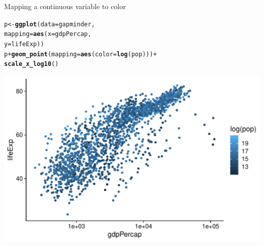 \documentclass[10pt,handout]{beamer}\usepackage[]{graphicx}\usepackage[]{color}
\makeatletter
\def\maxwidth{ %
  \ifdim\Gin@nat@width>\linewidth
    \linewidth
  \else
    \Gin@nat@width
  \fi
}
\newcommand{\hlopt}[1]{\textcolor[rgb]{0,0,0}{#1}}%
\newcommand{\hlstd}[1]{\textcolor[rgb]{0.345,0.345,0.345}{#1}}%
\newcommand{\hlkwb}[1]{\textcolor[rgb]{0.69,0.353,0.396}{#1}}%
\newcommand{\hlkwc}[1]{\textcolor[rgb]{0.333,0.667,0.333}{#1}}%
\newcommand{\hlkwd}[1]{\textcolor[rgb]{0.737,0.353,0.396}{\textbf{#1}}}%
\newenvironment{kframe}{%
 \def\at@end@of@kframe{}%
 \ifinner\ifhmode%
  \def\at@end@of@kframe{\end{minipage}}%
  \begin{minipage}{\columnwidth}%
 \fi\fi%
 \def\FrameCommand##1{\hskip\@totalleftmargin \hskip-\fboxsep
 \colorbox{shadecolor}{##1}\hskip-\fboxsep
     \hskip-\linewidth \hskip-\@totalleftmargin \hskip\columnwidth}%
 \MakeFramed {\advance\hsize-\width
   \@totalleftmargin\z@ \linewidth\hsize
   \@setminipage}}%
 {\par\unskip\endMakeFramed%
 \at@end@of@kframe}
\newenvironment{knitrout}{}{} %
\makeatother
\begin{document}
\begin{frame}[fragile]{Mapping a continuous variable to color}
\begin{knitrout}\tiny
{}\color{fgcolor}\begin{kframe}
\begin{alltt}
\hlstd{p} \hlkwb{<-} \hlkwd{ggplot}\hlstd{(}\hlkwc{data} \hlstd{= gapminder,}
            \hlkwc{mapping} \hlstd{=} \hlkwd{aes}\hlstd{(}\hlkwc{x} \hlstd{= gdpPercap,}
                          \hlkwc{y} \hlstd{= lifeExp))}
\hlstd{p} \hlopt{+} \hlkwd{geom_point}\hlstd{(}\hlkwc{mapping} \hlstd{=} \hlkwd{aes}\hlstd{(}\hlkwc{color} \hlstd{=} \hlkwd{log}\hlstd{(pop)))} \hlopt{+}
                 \hlkwd{scale_x_log10}\hlstd{()}
\end{alltt}
\end{kframe}

{\centering \includegraphics[width=\maxwidth]{figure/unnamed-chunk-19-1} 

}


\end{knitrout}

	
\end{frame}
\end{document}
